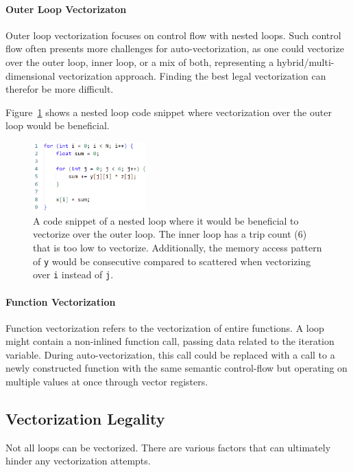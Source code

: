 \documentclass[sigplan,11pt,nonacm]{acmart}
\begin{document}
\paragraph{Outer Loop Vectorizaton}
Outer loop vectorization focuses on control flow with nested loops. Such control flow often presents
more challenges for auto-vectorization, as one could vectorize over the outer loop,
inner loop, or a mix of both, representing a hybrid/multi-dimensional vectorization approach.
Finding the best legal vectorization can therefor be more difficult.

Figure~\ref{fig:outer-loop-vec} shows a nested loop code snippet where vectorization over the
outer loop would be beneficial.

\begin{figure}
  \centering
  \includegraphics[width=0.39\textwidth]{images/outer-loop-vec.png}
  \caption{A code snippet of a nested loop where it would be beneficial to vectorize over the 
  outer loop. The inner loop has a trip count (6) that is too low to vectorize. Additionally,
  the memory access pattern of \texttt{y} would be consecutive compared to scattered when
  vectorizing over \texttt{i} instead of \texttt{j}.}
  \label{fig:outer-loop-vec}
\end{figure}

\paragraph{Function Vectorization}
Function vectorization refers to the vectorization of entire functions. A loop might contain a
non-inlined function call, passing data related to the iteration variable. During auto-vectorization, 
this call could be replaced with a call to a newly constructed function with the same semantic 
control-flow but operating on multiple values at once through vector registers.
 
\subsection{Vectorization Legality}
\label{sec:vec-legal}
Not all loops can be vectorized. There are various factors that can ultimately hinder any
vectorization attempts.
\end{document}
